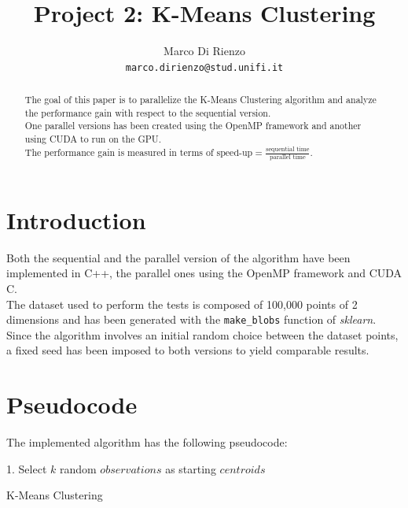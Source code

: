 \documentclass[10pt,twocolumn,letterpaper]{article}
\begin{document}
\title{Project 2: K-Means Clustering}

\author{Marco Di Rienzo\\
{\tt\small marco.dirienzo@stud.unifi.it}
}

\maketitle
\thispagestyle{empty}

\begin{abstract}
	The goal of this paper is to parallelize the K-Means Clustering algorithm and analyze the performance gain with respect to the sequential version.\\
	One parallel versions has been created using the OpenMP framework and another using CUDA to run on the GPU.\\
	The performance gain is measured in terms of $\text{speed-up}=\frac{\text{sequential time}}{\text{parallel time}}$.
\end{abstract}

\section{Introduction}
Both the sequential and the parallel version of the algorithm have been implemented in C++, the parallel ones using the OpenMP framework and CUDA C.\\
The dataset used to perform the tests is composed of 100,000 points of 2 dimensions and has been generated with the \texttt{make\_blobs} function of \textit{sklearn}.\\
Since the algorithm involves an initial random choice between the dataset points, a fixed seed has been imposed to both versions to yield comparable results.

\section{Pseudocode}
The implemented algorithm has the following pseudocode:
\begin{algorithm}
	\SetAlgoLined
	1. Select $k$ random $observations$ as starting $centroids$\;
	\caption{K-Means Clustering}
	\label{pseudocode}
\end{algorithm}
\end{document}
